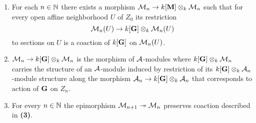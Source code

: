 \begin{remark}
\begin{enumerate}[label=\textbf{(\arabic*)}, leftmargin=3.0em]
\item For each $n\in {\mathbb N}$ there exists a morphism ${\mathcal M}_n\rightarrow k[\mathbf{M}]\otimes_k{\mathcal M}_n$ such that for every open affine neighborhood $U$ of $Z_0$ its restriction 
$${\mathcal M}_n(U)\rightarrow k[\mathbf{G}]\otimes_k {\mathcal M}_n(U)$$
to sections on $U$ is a coaction of $k[\mathbf{G}]$ on ${\mathcal M}_n(U)$.
\item ${\mathcal M}_n \rightarrow k[\mathbf{G}]\otimes_k{\mathcal M}_n$ is the morphism of ${\mathcal A}$-modules where $k[\mathbf{G}]\otimes_k{\mathcal M}_n$ carries the structure of an ${\mathcal A}$-module induced by restriction of its $k[\mathbf{G}]\otimes_k{\mathcal A}_n$-module structure along the morphism ${\mathcal A}_n\rightarrow k[\mathbf{G}]\otimes_k{\mathcal A}_n$ that corresponds to action of $\mathbf{G}$ on $Z_n$.
\item For every $n\in {\mathbb N}$ the epimorphism ${\mathcal M}_{n+1} \twoheadrightarrow {\mathcal M}_n$ preserves coaction described in \textbf{(3)}.
\end{enumerate}
\end{remark}

